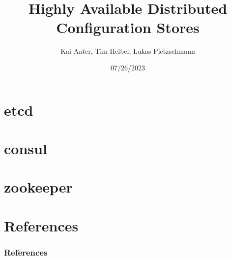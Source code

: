 \documentclass[aspectratio=169, usepdftitle=false]{beamer}
\title[Highly Available Distributed Config Stores]{Highly Available Distributed Configuration Stores}
\author[Kai, Tim, Lukas]{Kai Anter, Tim Heibel, Lukas Pietzschmann}
\subtitle{}
\institute{Institute of Distributed Systems}
\date{07/26/2023}
\begin{document}
\maketitle

\section{etcd}


\section{consul}


\section{zookeeper}


\section{References}
\begin{frame}[allowframebreaks]
	\frametitle{References}
	\printbibliography
\end{frame}
\end{document}
